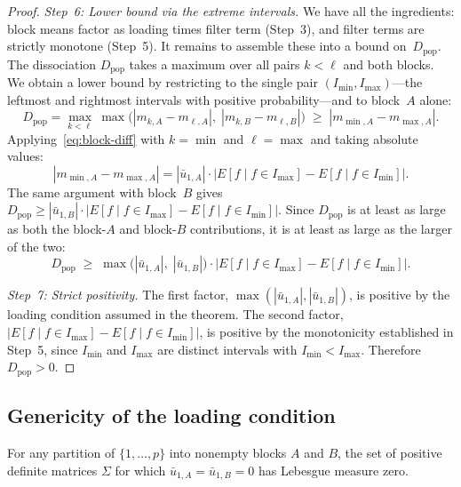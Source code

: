 \documentclass[hidelinks]{siamart251216}
\makeatletter
\let\SM@origTheTheorem\thetheorem
\newcommand{\restoretheoremnum}{\let\thetheorem\SM@origTheTheorem}
\makeatother
\begin{document}
\begin{proof}
  \emph{Step~6: Lower bound via the extreme intervals.}
  We have all the ingredients: block means factor as loading times
  filter term (Step~3), and filter terms are strictly monotone
  (Step~5).  It remains to assemble these into a bound
  on~$D_{\mathrm{pop}}$.
  The dissociation $D_{\mathrm{pop}}$ takes a maximum over all pairs
  $k < \ell$ and both blocks.  We obtain a lower bound by restricting
  to the single pair $(I_{\min}, I_{\max})$---the leftmost and
  rightmost intervals with positive probability---and to block~$A$
  alone:
  \[
    D_{\mathrm{pop}}
    = \max_{k < \ell}\,\max\!\bigl(|m_{k,A} - m_{\ell,A}|,\;
      |m_{k,B} - m_{\ell,B}|\bigr)
    \;\ge\; |m_{\min,A} - m_{\max,A}|.
  \]
  Applying~\eqref{eq:block-diff} with $k = \min$ and $\ell = \max$
  and taking absolute values:
  \[
    |m_{\min,A} - m_{\max,A}|
    = |\bar{u}_{1,A}| \cdot
      \bigl|E[f \mid f \in I_{\max}] - E[f \mid f \in I_{\min}]\bigr|.
  \]
  The same argument with block~$B$ gives
  $D_{\mathrm{pop}} \ge |\bar{u}_{1,B}| \cdot
  |E[f \mid f \in I_{\max}] - E[f \mid f \in I_{\min}]|$.
  Since $D_{\mathrm{pop}}$ is at least as large as both the block-$A$
  and block-$B$ contributions, it is at least as large as the larger
  of the two:
  \[
    D_{\mathrm{pop}}
    \;\ge\; \max\!\bigl(|\bar{u}_{1,A}|,\; |\bar{u}_{1,B}|\bigr)
    \cdot \bigl|E[f \mid f \in I_{\max}]
    - E[f \mid f \in I_{\min}]\bigr|.
  \]

  \emph{Step~7: Strict positivity.}
  The first factor, $\max(|\bar{u}_{1,A}|, |\bar{u}_{1,B}|)$, is
  positive by the loading condition assumed in the theorem.  The second
  factor, $|E[f \mid f \in I_{\max}] - E[f \mid f \in I_{\min}]|$, is
  positive by the monotonicity established in Step~5, since $I_{\min}$
  and $I_{\max}$ are distinct intervals with $I_{\min} < I_{\max}$.
  Therefore $D_{\mathrm{pop}} > 0$.
\end{proof}
\restoretheoremnum


\subsection{Genericity of the loading condition}\label{supp:genericity}

\begin{proposition}\label{prop:genericity}
  For any partition of $\{1, \ldots, p\}$ into nonempty blocks $A$ and
  $B$, the set of positive definite matrices $\Sigma$ for which
  $\bar{u}_{1,A} = \bar{u}_{1,B} = 0$ has Lebesgue measure zero.
\end{proposition}
\end{document}
